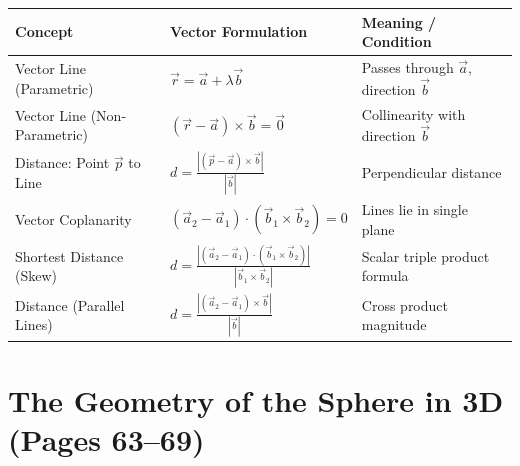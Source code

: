 \begin{theorembox}
\begin{center}
\small
\renewcommand{\arraystretch}{1.25}
\setlength{\tabcolsep}{4pt}
\begin{tabular}{|p{3.8cm}|p{5.1cm}|p{5.0cm}|}
\hline
\textbf{Concept} & \textbf{Vector Formulation} & \textbf{Meaning / Condition} \\
\hline
Vector Line (Parametric) & $\vec{r} = \vec{a} + \lambda \vec{b}$ & Passes through $\vec{a}$, direction $\vec{b}$ \\
Vector Line (Non-Parametric) & $(\vec{r} - \vec{a}) \times \vec{b} = \vec{0}$ & Collinearity with direction $\vec{b}$ \\
Distance: Point $\vec{p}$ to Line & $\displaystyle d = \frac{|(\vec{p} - \vec{a}) \times \vec{b}|}{|\vec{b}|}$ & Perpendicular distance \\
Vector Coplanarity & $(\vec{a}_2 - \vec{a}_1) \cdot (\vec{b}_1 \times \vec{b}_2) = 0$ & Lines lie in single plane \\
Shortest Distance (Skew) & $\displaystyle d = \frac{|(\vec{a}_2 - \vec{a}_1) \cdot (\vec{b}_1 \times \vec{b}_2)|}{|\vec{b}_1 \times \vec{b}_2|}$ & Scalar triple product formula \\
Distance (Parallel Lines) & $\displaystyle d = \frac{|(\vec{a}_2 - \vec{a}_1) \times \vec{b}|}{|\vec{b}|}$ & Cross product magnitude \\
\hline
\end{tabular}
\end{center}
\end{theorembox}

\section{The Geometry of the Sphere in 3D (Pages 63--69)}

